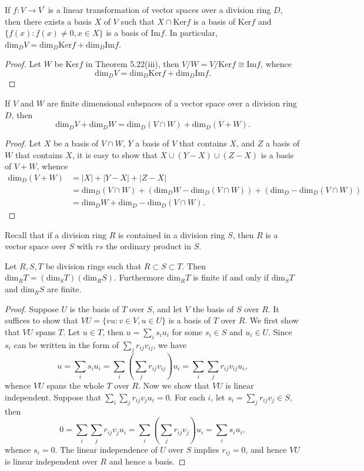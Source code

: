 \begin{corollary}
If $f:V\to V^\prime$ is a linear transformation of vector spaces over a division ring $D$, then there exists a basis $X$ of $V$ such that $X\cap\mathrm{Ker}f$ is a basis of $\mathrm{Ker}f$ and $\{f(x):f(x)\ne 0,x\in X\}$ is a basis of $\mathrm{Im}f$. In particular, $\mathrm{dim}_DV=\mathrm{dim}_D\mathrm{Ker}f+\mathrm{dim}_D\mathrm{Im}f$.
\end{corollary}
\begin{proof}
Let $W$ be $\mathrm{Ker}f$ in Theorem 5.22(iii), then $V/W=V/\mathrm{Ker}f\cong\mathrm{Im}f$, whence 
$$
\mathrm{dim}_DV=\mathrm{dim}_D\mathrm{Ker}f+\mathrm{dim}_D\mathrm{Im}f.
$$
\end{proof}
\begin{corollary}
If $V$ and $W$ are finite dimensional subspaces of a vector space over a division ring $D$, then 
$$
\mathrm{dim}_DV+\mathrm{dim}_DW=\mathrm{dim}_D\left( V\cap W \right) +\mathrm{dim}_D\left( V+W \right) .
$$
\end{corollary}
\begin{proof}
Let $X$ be a basis of $V\cap W$, $Y$ a basis of $V$ that contains $X$, and $Z$ a basis of $W$ that contains $X$, it is easy to show that $X\cup(Y-X)\cup(Z-X)$ is a basis of $V+W$, whence 
$$
\begin{aligned}
\mathrm{dim}_D\left( V+W \right)& =\left| X \right|+\left| Y-X \right|+\left| Z-X \right|
\\
&=\mathrm{dim}_D\left( V\cap W \right) +\left( \mathrm{dim}_DW-\mathrm{dim}_D\left( V\cap W \right) \right) +\left( \mathrm{dim}_D-\mathrm{dim}_D\left( V\cap W \right) \right) 
\\
&=\mathrm{dim}_DW+\mathrm{dim}_D-\mathrm{dim}_D\left( V\cap W \right) .
\end{aligned}
$$
\end{proof}
Recall that if a division ring $R$ is contained in a division ring $S$, then $R$ is a vector space over $S$ with $rs$ the ordinary product in $S$.
\begin{theorem}
Let $R,S,T$ be division rings such that $R\subset S\subset T$. Then $\mathrm{dim}_RT=(\mathrm{dim}_ST)(\mathrm{dim}_RS)$. Furthermore $\mathrm{dim}_RT$ is finite if and only if $\mathrm{dim}_ST$ and $\mathrm{dim}_RS$ are finite.
\end{theorem}
\begin{proof}
Suppose $U$ is the basis of $T$ over $S$, and let $V$ the basis of $S$ over $R$. It suffices to show that $VU=\{vu:v\in V,u\in U\}$ is a basis of $T$ over $R$. We first show that $VU$ spans $T$. Let $u\in T$, then $u=\sum_is_iu_i$ for some $s_i\in S$ and $u_i\in U$. Since $s_i$ can be written in the form of $\sum_jr_{ij}v_{ij}$, we have 
$$
u=\sum_i{s_iu_i}=\sum_i{\left( \sum_j{r_{ij}v_{ij}} \right) u_i}=\sum_i{\sum_j{r_{ij}v_{ij}u_i}},
$$
whence $VU$ spans the whole $T$ over $R$. Now we show that $VU$ is linear independent. Suppose that $\sum_i\sum_jr_{ij}v_ju_i=0$. For each $i$, let $s_i=\sum_jr_{ij}v_j\in S$, then 
$$
0=\sum_i{\sum_j{r_{ij}v_ju_i}}=\sum_i{\left( \sum_j{r_{ij}v_j} \right) u_i}=\sum_i{s_iu_i},
$$
whence $s_i=0$. The linear independence of $U$ over $S$ implies $r_{ij}=0$, and hence $VU$ is linear independent over $R$ and hence a basis.
\end{proof}
